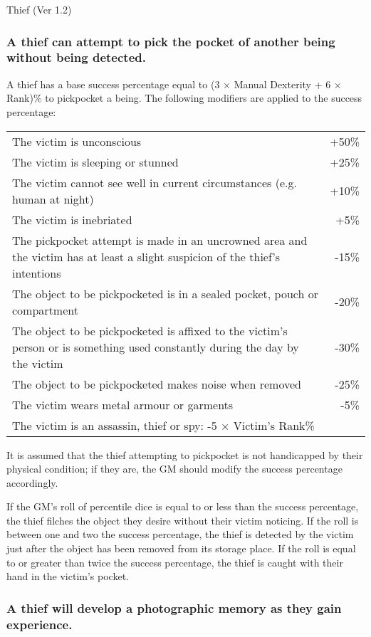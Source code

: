 \begin{Chapter}{Thief (Ver 1.2)}
\subsubsection{A thief can attempt to pick the pocket of another being without
being detected.}

A thief has a base success percentage equal to (3 × Manual Dexterity +
6 × Rank)\% to pickpocket a being.  The following modifiers are
applied to the success percentage:

\begin{tabularx}{\columnwidth}{Xr}
The victim is unconscious		& +50\% \\
The victim is sleeping or stunned	& +25\% \\
The victim cannot see well in current circumstances (e.g. human at night)	& +10\% \\
The victim is inebriated		& +5\% \\
The pickpocket attempt is made in an uncrowned area and the victim has at least a slight suspicion of the thief’s intentions	& -15\% \\
The object to be pickpocketed is in a sealed pocket, pouch or compartment	& -20\% \\
The object to be pickpocketed is affixed to the victim’s person or is something used constantly during the day by the victim	& -30\% \\
The object to be pickpocketed makes noise when removed	& -25\% \\
The victim wears metal armour or garments	& -5\% \\
The victim is an assassin, thief or spy: -5 × Victim’s Rank\%	& \\
\end{tabularx}

It is assumed that the thief attempting to pickpocket is not
handicapped by their physical condition; if they are, the GM should
modify the success percentage accordingly.

If the GM’s roll of percentile dice is equal to or less than the
success percentage, the thief filches the object they desire without
their victim noticing.  If the roll is between one and two the success
percentage, the thief is detected by the victim just after the object
has been removed from its storage place.  If the roll is equal to or
greater than twice the success percentage, the thief is caught with
their hand in the victim’s pocket.

\subsubsection{A thief will develop a photographic memory as they gain experience.}


\end{Chapter}
